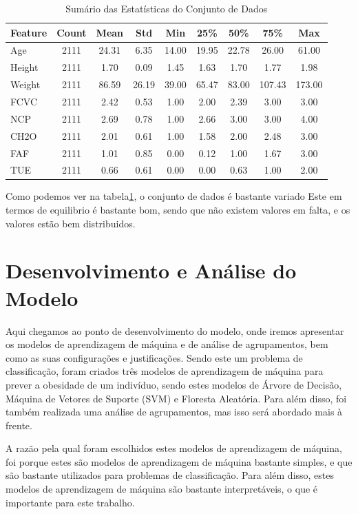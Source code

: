 \documentclass{easychair}
\begin{document}
\begin{table}[ht]
  \centering
  \begin{tabular}{l c c c c c c c c}
  \toprule
  Feature & Count & Mean & Std & Min & 25\% & 50\% & 75\% & Max \\
  \midrule
  Age & 2111 & 24.31 & 6.35 & 14.00 & 19.95 & 22.78 & 26.00 & 61.00 \\
  Height & 2111 & 1.70 & 0.09 & 1.45 & 1.63 & 1.70 & 1.77 & 1.98 \\
  Weight & 2111 & 86.59 & 26.19 & 39.00 & 65.47 & 83.00 & 107.43 & 173.00 \\
  FCVC & 2111 & 2.42 & 0.53 & 1.00 & 2.00 & 2.39 & 3.00 & 3.00 \\
  NCP & 2111 & 2.69 & 0.78 & 1.00 & 2.66 & 3.00 & 3.00 & 4.00 \\
  CH2O & 2111 & 2.01 & 0.61 & 1.00 & 1.58 & 2.00 & 2.48 & 3.00 \\
  FAF & 2111 & 1.01 & 0.85 & 0.00 & 0.12 & 1.00 & 1.67 & 3.00 \\
  TUE & 2111 & 0.66 & 0.61 & 0.00 & 0.00 & 0.63 & 1.00 & 2.00 \\
  \bottomrule
  \end{tabular}
  \caption{Sumário das Estatísticas do Conjunto de Dados}
  \label{tab:summary}
\end{table}

Como podemos ver na tabela\ref{tab:summary}, o conjunto de dados é bastante variado Este em termos de equilibrio é bastante bom, sendo que não existem valores em falta, e os valores estão bem distribuidos.

\section{Desenvolvimento e Análise do Modelo}

Aqui chegamos ao ponto de desenvolvimento do modelo, onde iremos apresentar os modelos de aprendizagem de máquina e de análise de agrupamentos, bem como as suas configurações e justificações. Sendo este um problema de classificação, foram criados três modelos de aprendizagem de máquina para prever a obesidade de um indivíduo, sendo estes modelos de Árvore de Decisão, Máquina de Vetores de Suporte (SVM) e Floresta Aleatória. Para além disso, foi também realizada uma análise de agrupamentos, mas isso será abordado mais à frente.

A razão pela qual foram escolhidos estes modelos de aprendizagem de máquina, foi porque estes são modelos de aprendizagem de máquina bastante simples, e que são bastante utilizados para problemas de classificação. Para além disso, estes modelos de aprendizagem de máquina são bastante interpretáveis, o que é importante para este trabalho.
\end{document}
